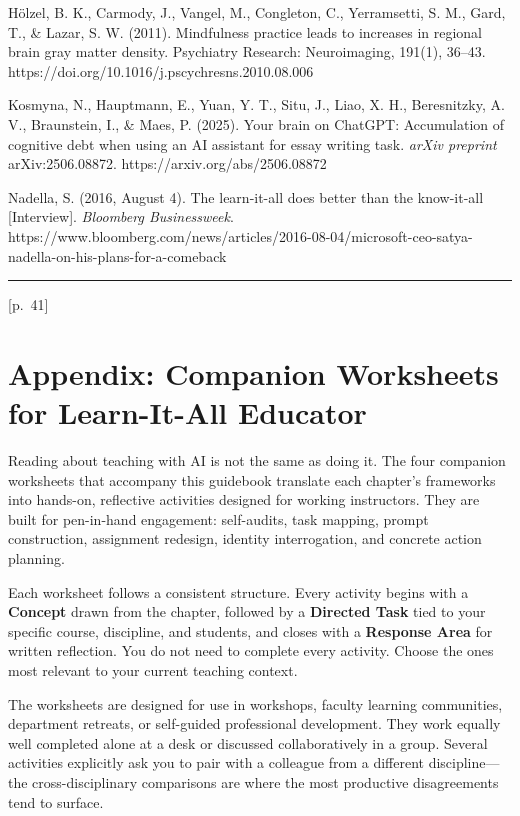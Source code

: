 \documentclass[
  letterpaper,
  DIV=11,
  numbers=noendperiod]{scrreprt}
\begin{document}
Hölzel, B. K., Carmody, J., Vangel, M., Congleton, C., Yerramsetti, S.
M., Gard, T., \& Lazar, S. W. (2011). Mindfulness practice leads to
increases in regional brain gray matter density. Psychiatry Research:
Neuroimaging, 191(1), 36--43.
https://doi.org/10.1016/j.pscychresns.2010.08.006

Kosmyna, N., Hauptmann, E., Yuan, Y. T., Situ, J., Liao, X. H.,
Beresnitzky, A. V., Braunstein, I., \& Maes, P. (2025). Your brain on
ChatGPT: Accumulation of cognitive debt when using an AI assistant for
essay writing task. \emph{arXiv preprint} arXiv:2506.08872.
https://arxiv.org/abs/2506.08872

Nadella, S. (2016, August 4). The learn-it-all does better than the
know-it-all {[}Interview{]}. \emph{Bloomberg Businessweek}.
https://www.bloomberg.com/news/articles/2016-08-04/microsoft-ceo-satya-nadella-on-his-plans-for-a-comeback

\begin{center}\rule{0.5\linewidth}{0.5pt}\end{center}

{[}p.~41{]}


\chapter{Appendix: Companion Worksheets for Learn-It-All
Educator}\label{appendix-companion-worksheets-for-learn-it-all-educator}

Reading about teaching with AI is not the same as doing it. The four
companion worksheets that accompany this guidebook translate each
chapter's frameworks into hands-on, reflective activities designed for
working instructors. They are built for pen-in-hand engagement:
self-audits, task mapping, prompt construction, assignment redesign,
identity interrogation, and concrete action planning.

Each worksheet follows a consistent structure. Every activity begins
with a \textbf{Concept} drawn from the chapter, followed by a
\textbf{Directed Task} tied to your specific course, discipline, and
students, and closes with a \textbf{Response Area} for written
reflection. You do not need to complete every activity. Choose the ones
most relevant to your current teaching context.

The worksheets are designed for use in workshops, faculty learning
communities, department retreats, or self-guided professional
development. They work equally well completed alone at a desk or
discussed collaboratively in a group. Several activities explicitly ask
you to pair with a colleague from a different discipline---the
cross-disciplinary comparisons are where the most productive
disagreements tend to surface.
\end{document}
